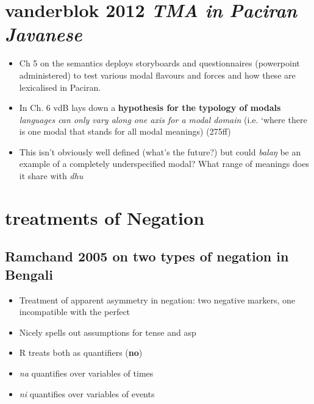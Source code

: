 \documentclass[10pt]{article}
\begin{document}
\section{vanderblok 2012 \textit{TMA in Paciran Javanese}}
	\begin{itemize}
		\item Ch 5 on the semantics deploys storyboards and questionnaires (powerpoint administered) to test various modal flavours and forces and how these are lexicalised in Paciran.
		\item In Ch. 6 vdB lays down a \textbf{hypothesis for the typology of modals} \textit{languages can only vary along one axis for a modal domain }(i.e. `where there is one modal that stands for all modal meanings) (275ff)
		\item{\color{violet} This isn't obviously well defined (what's the future?) but could \textit{balaŋ} be an example of a completely underspecified modal? What range of meanings does it share with \textit{dhu}}

	\end{itemize}

\section{treatments of Negation}
	\subsection{Ramchand 2005 on two types of negation in Bengali}
\begin{itemize}
	\item Treatment of apparent asymmetry in negation: two negative markers, one incompatible with the perfect
	\item Nicely spells out assumptions for tense and asp
	\item R treats both as quantifiers (\textbf{no})
	\item \textit{na} quantifies over variables of times
	\item \textit{ni} quantifies over variables of events
\end{itemize}
\end{document}

